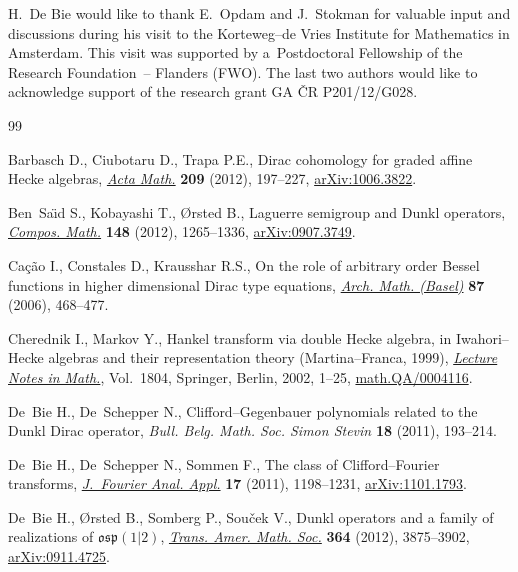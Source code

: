 \documentclass[pdftex]{sigma}
\numberwithin{equation}{section}
\numberwithin{theorem}{section}
\numberwithin{proposition}{section}
\numberwithin{lemma}{section}
\numberwithin{corollary}{section}
\numberwithin{definition}{section}
\numberwithin{example}{section}
\numberwithin{remark}{section}
\numberwithin{note}{section}
\theoremstyle{remark}
\begin{document}
H.~De Bie would like to thank E.~Opdam and J.~Stokman for valuable input and discussions during his
visit to the Korteweg--de Vries Institute for Mathematics in Amsterdam.
This visit was supported by a~Postdoctoral Fellowship of the Research Foundation~-- Flanders (FWO).
The last two authors would like to acknowledge support of the research grant GA \v{C}R P201/12/G028.

\begin{thebibliography}{99}
\footnotesize\itemsep=0pt

Barbasch D., Ciubotaru D., Trapa P.E., Dirac cohomology for graded af\/f\/ine
{H}ecke algebras, \href{http://dx.doi.org/10.1007/s11511-012-0085-3}{\textit{Acta Math.}}
\textbf{209} (2012), 197--227,
\href{http://arxiv.org/abs/1006.3822}{arXiv:1006.3822}.

Ben~Sa{\"{\i}}d S., Kobayashi T., {\O}rsted B., Laguerre semigroup and {D}unkl
operators, \href{http://dx.doi.org/10.1112/S0010437X11007445}{\textit{Compos.
Math.}} \textbf{148} (2012), 1265--1336,
\href{http://arxiv.org/abs/0907.3749}{arXiv:0907.3749}.

Ca{\c{c}}{\~a}o I., Constales D., Krausshar R.S., On the role of arbitrary
order {B}essel functions in higher dimensional {D}irac type equations,
\href{http://dx.doi.org/10.1007/s00013-006-1791-x}{\textit{Arch.
Math.
(Basel)}} \textbf{87} (2006), 468--477.

Cherednik I., Markov Y., Hankel transform via double {H}ecke algebra, in
Iwahori--{H}ecke algebras and their representation theory
({M}artina--{F}ranca, 1999), \href{http://dx.doi.org/10.1007/978-3-540-36205-0_1}{\textit{Lecture
Notes in Math.}}, Vol.~1804,
Springer, Berlin, 2002, 1--25, \href{http://arxiv.org/abs/math.QA/0004116}{math.QA/0004116}.

De~Bie H., De~Schepper N., Clif\/ford--{G}egenbauer polynomials related to the
{D}unkl {D}irac operator, \textit{Bull.
Belg.
Math.
Soc.
Simon Stevin}
\textbf{18} (2011), 193--214.

De~Bie H., De~Schepper N., Sommen F., The class of {C}lif\/ford--{F}ourier
transforms, \href{http://dx.doi.org/10.1007/s00041-011-9177-2}{\textit{J.~Fourier Anal.
Appl.}} \textbf{17} (2011), 1198--1231,
\href{http://arxiv.org/abs/1101.1793}{arXiv:1101.1793}.

De~Bie H., {\O}rsted B., Somberg P., Sou{\v{c}}ek V., Dunkl operators and a
family of realizations of {$\mathfrak{osp}(1\vert2)$},
\href{http://dx.doi.org/10.1090/S0002-9947-2012-05608-X}{\textit{Trans.
Amer.
Math.
Soc.}} \textbf{364} (2012), 3875--3902, \href{http://arxiv.org/abs/0911.4725}{arXiv:0911.4725}.


\end{thebibliography}
\end{document}
